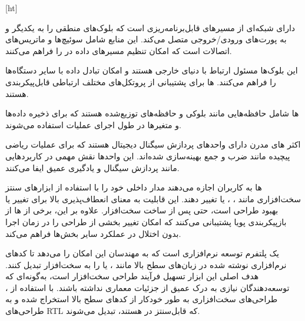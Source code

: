 [ht]


دارای شبکه‌ای از مسیرهای قابل‌برنامه‌ریزی است که بلوک‌های منطقی را به یکدیگر و به پورت‌های ورودی/خروجی متصل می‌کند. این منابع شامل سوئیچ‌ها و ماتریس‌های اتصالات است که امکان تنظیم مسیرهای داده در  را فراهم می‌کنند.

این بلوک‌ها مسئول ارتباط  با دنیای خارجی هستند و امکان تبادل داده با سایر دستگاه‌ها را فراهم می‌کنند. ها برای پشتیبانی از پروتکل‌های مختلف ارتباطی قابل‌پیکربندی هستند.


ها
شامل حافظه‌هایی مانند  بلوکی و حافظه‌های توزیع‌شده هستند که برای ذخیره داده‌ها و متغیرها در طول اجرای عملیات استفاده می‌شوند.


اکثر های مدرن دارای واحدهای پردازش سیگنال دیجیتال هستند که برای عملیات ریاضی پیچیده مانند ضرب و جمع بهینه‌سازی شده‌اند. این واحدها نقش مهمی در کاربردهایی مانند پردازش سیگنال و یادگیری عمیق ایفا می‌کنند.


ها
به کاربران اجازه می‌دهند مدار داخلی خود را با استفاده از ابزارهای سنتز سخت‌افزاری مانند ، ، یا  تغییر دهند. این قابلیت به معنای انعطاف‌پذیری بالا برای تغییر یا بهبود طراحی است، حتی پس از ساخت سخت‌افزار. علاوه بر این، برخی از ها از بازپیکربندی پویا پشتیبانی می‌کنند که امکان تغییر بخشی از طراحی را در زمان اجرا بدون اختلال در عملکرد سایر بخش‌ها فراهم می‌کند.


یک پلتفرم توسعه نرم‌افزاری است که به مهندسان این امکان را می‌دهد تا کدهای نرم‌افزاری نوشته شده در زبان‌های سطح بالا مانند ،  یا  را به سخت‌افزار  تبدیل کنند. هدف اصلی این ابزار تسهیل فرآیند طراحی سخت‌افزار است، به‌گونه‌ای که توسعه‌دهندگان نیازی به درک عمیق از جزئیات معماری  نداشته باشند. با استفاده از ، طراحی‌های سخت‌افزاری به طور خودکار از کدهای سطح بالا استخراج شده و به طراحی‌های RTL که قابل‌سنتز در  هستند، تبدیل می‌شوند.




